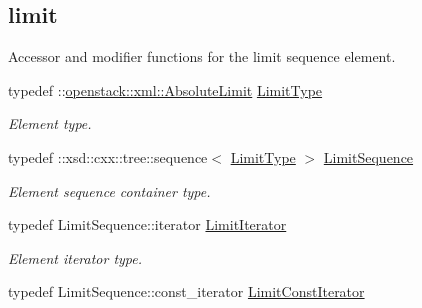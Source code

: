 \subsection*{limit}
\label{_amgrpaa9f73eea60a006820d0f8768bc8a3fc}
Accessor and modifier functions for the limit sequence element. \begin{DoxyCompactItemize}
\item 
\hypertarget{classopenstack_1_1xml_1_1AbsoluteLimits_ae718e29eedc3c8bb33bdbfc624b3f062}{
typedef ::\hyperlink{classopenstack_1_1xml_1_1AbsoluteLimit}{openstack::xml::AbsoluteLimit} \hyperlink{classopenstack_1_1xml_1_1AbsoluteLimits_ae718e29eedc3c8bb33bdbfc624b3f062}{LimitType}}
\label{classopenstack_1_1xml_1_1AbsoluteLimits_ae718e29eedc3c8bb33bdbfc624b3f062}

\begin{DoxyCompactList}\small\item\em Element type. \item\end{DoxyCompactList}\item 
\hypertarget{classopenstack_1_1xml_1_1AbsoluteLimits_ab7c2c30ecf1fa25041fc712630ea5169}{
typedef ::xsd::cxx::tree::sequence$<$ \hyperlink{classopenstack_1_1xml_1_1AbsoluteLimit}{LimitType} $>$ \hyperlink{classopenstack_1_1xml_1_1AbsoluteLimits_ab7c2c30ecf1fa25041fc712630ea5169}{LimitSequence}}
\label{classopenstack_1_1xml_1_1AbsoluteLimits_ab7c2c30ecf1fa25041fc712630ea5169}

\begin{DoxyCompactList}\small\item\em Element sequence container type. \item\end{DoxyCompactList}\item 
\hypertarget{classopenstack_1_1xml_1_1AbsoluteLimits_ac52a4f6cd875a126acc6c220a5605fdb}{
typedef LimitSequence::iterator \hyperlink{classopenstack_1_1xml_1_1AbsoluteLimits_ac52a4f6cd875a126acc6c220a5605fdb}{LimitIterator}}
\label{classopenstack_1_1xml_1_1AbsoluteLimits_ac52a4f6cd875a126acc6c220a5605fdb}

\begin{DoxyCompactList}\small\item\em Element iterator type. \item\end{DoxyCompactList}\item 
\hypertarget{classopenstack_1_1xml_1_1AbsoluteLimits_a6225cb23aa515f261ab96006c0e1fabe}{
typedef LimitSequence::const\_\-iterator \hyperlink{classopenstack_1_1xml_1_1AbsoluteLimits_a6225cb23aa515f261ab96006c0e1fabe}{LimitConstIterator}}
\label{classopenstack_1_1xml_1_1AbsoluteLimits_a6225cb23aa515f261ab96006c0e1fabe}


\end{DoxyCompactItemize}
